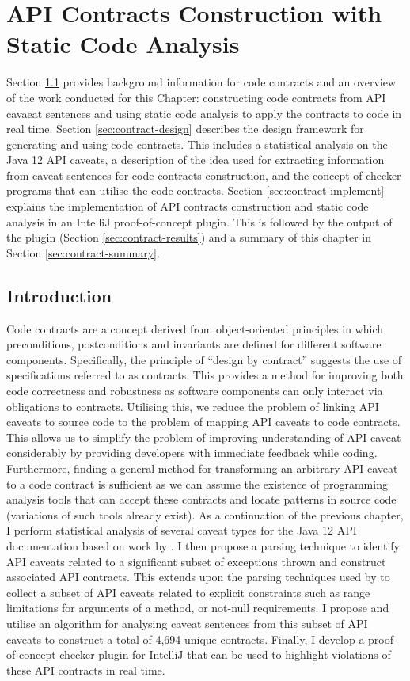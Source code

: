 \chapter{API Contracts Construction with Static Code Analysis}
\label{cha:codeAnalysis}
Section \ref{sec:contract-intro} provides background information for code contracts and an overview of the work conducted for this Chapter: constructing code contracts from API cavaeat sentences and using static code analysis to apply the contracts to code in real time. Section \ref{sec:contract-design} describes the design framework for generating and using code contracts. This includes a statistical analysis on the Java 12 API caveats, a description of the idea used for extracting information from caveat sentences for code contracts construction, and the concept of checker programs that can utilise the code contracts. Section \ref{sec:contract-implement} explains the implementation of API contracts construction and static code analysis in an IntelliJ proof-of-concept plugin. This is followed by the output of the plugin (Section \ref{sec:contract-results}) and a summary of this chapter in Section \ref{sec:contract-summary}.

\section{Introduction}
\label{sec:contract-intro}
Code contracts are a concept derived from object-oriented principles in which preconditions, postconditions and invariants are defined for different software components. Specifically, the principle of ``design by contract'' suggests the use of specifications referred to as contracts. This provides a method for improving both code correctness and robustness as software components can only interact via obligations to contracts. Utilising this, we reduce the problem of linking API caveats to source code to the problem of mapping API caveats to code contracts. This allows us to simplify the problem of improving understanding of API caveat considerably by providing developers with immediate feedback while coding. Furthermore, finding a general method for transforming an arbitrary API caveat to a code contract is sufficient as we can assume the existence of programming analysis tools that can accept these contracts and locate patterns in source code (variations of such tools already exist). As a continuation of the previous chapter, I perform statistical analysis of several caveat types for the Java 12 API documentation based on work by \cite{zhou-directive}. I then propose a parsing technique to identify API caveats related to a significant subset of exceptions thrown and construct associated API contracts. This extends upon the parsing techniques used by \citeauthor{zhou-directive} to collect a subset of API caveats related to explicit constraints such as range limitations for arguments of a method, or not-null requirements. I propose and utilise an algorithm for analysing caveat sentences from this subset of API caveats to construct a total of 4,694 unique contracts. Finally, I develop a proof-of-concept checker plugin for IntelliJ that can be used to highlight violations of these API contracts in real time. \\

